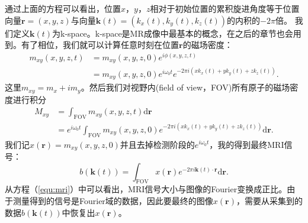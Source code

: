 通过上面的方程可以看出，位置$x$，$y$，$z$相对于初始位置的累积旋进角度等于位置向量$\mathrm{\textbf{r}}=(x,y,z)$与向量$\mathrm{\textbf{k}}(t)=(k_x(t),k_y(t),k_z(t))$的内积的$-2\pi$倍。
我们定义$\mathrm{\textbf{k}}(t)$为k-space。k-space是MR成像中最基本的概念，在之后的章节也会用到。有了相位，我们就可以计算任意时刻在位置$\mathrm{\textbf{r}}$的磁场密度：
\begin{equation}
	\begin{aligned}
		m_{xy}(x,y,z,t)&=m_{xy}(x,y,z,0)e^{i\phi(x,y,z,t)} \\
&=m_{xy}(x,y,z,0)e^{i\omega_0t}e^{-2\pi i(xk_x(t)+yk_y(t)+zk_z(t))}.
	\end{aligned}
\end{equation}
这里$m_{xy}=m_x+im_y$。然后我们对视野内(field of view，FOV)所有原子的磁场密度进行积分
\begin{equation}
	\begin{aligned}
		M_{xy}&=\int_{\mathrm{FOV}}m_{xy}(x,y,z,t)\mathrm{d}\mathrm{\textbf{r}} \\
&=e^{i\omega_0t}\int_{\mathrm{FOV}}m_{xy}(x,y,z,0)e^{-2\pi i(xk_x(t)+yk_y(t)+zk_z(t))}\mathrm{d}\mathrm{\textbf{r}}.
	\end{aligned}
\end{equation}
我们记$x(\mathrm{\textbf{r}})=m_{xy}(x,y,z,0)$并且去掉检测阶段的$e^{i\omega_0t}$，我的得到最终MRI信号：
\begin{equation}
	b(\mathrm{\textbf{k}}(t)) = \int_{\mathrm{FOV}}x(\mathrm{\textbf{r}})e^{-2\pi i\mathrm{\textbf{k}}(t) \cdot \mathrm{\textbf{r}}}\mathrm{d}\mathrm{\textbf{r}}.
	\label{equ:mri}
\end{equation}
从方程（\ref{equ:mri}）中可以看出，MRI信号大小与图像的Fourier变换成正比。由于测量得到的信号是Fourier域的数据，因此要最终的图像$x(\mathrm{\textbf{r}})$，需要从采集到的数据$b(\mathrm{\textbf{k}}(t))$中恢复出$x(\mathrm{\textbf{r}})$。

